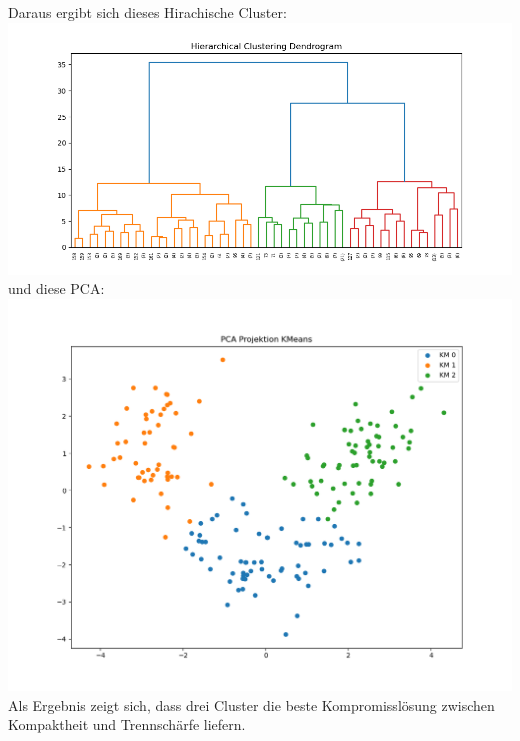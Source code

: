 \documentclass[a4paper,12pt]{scrartcl}
\begin{document}
Daraus ergibt sich dieses Hirachische Cluster:\\
\includegraphics*[scale=0.6]{Hirac_clustering.png}\\
und diese PCA:\\
\includegraphics*[scale=0.6]{PCA_py.png}
Als Ergebnis zeigt sich, dass drei Cluster die beste Kompromisslösung zwischen Kompaktheit und Trennschärfe liefern.

\newpage
\end{document}
